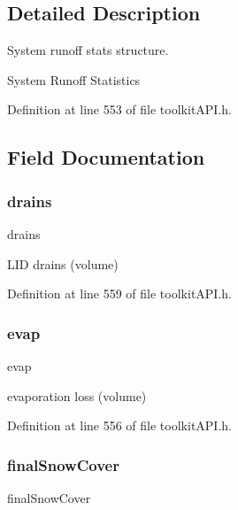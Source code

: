 \subsection{Detailed Description}
System runoff stats structure. 

System Runoff Statistics 

Definition at line 553 of file toolkit\+A\+P\+I.\+h.



\subsection{Field Documentation}
\mbox{\label{struct_s_m___runoff_totals_aee262996ca8263b6f94774a0c337ddb4}} 
\subsubsection{\texorpdfstring{drains}{drains}}
{\footnotesize\ttfamily drains}

L\+ID drains (volume) 

Definition at line 559 of file toolkit\+A\+P\+I.\+h.

\mbox{\label{struct_s_m___runoff_totals_aac3c1df7592191453d2ff02e5ff1b7e6}} 
\subsubsection{\texorpdfstring{evap}{evap}}
{\footnotesize\ttfamily evap}

evaporation loss (volume) 

Definition at line 556 of file toolkit\+A\+P\+I.\+h.

\mbox{\label{struct_s_m___runoff_totals_a50e84cf1314dcc39864c68c3ad316055}} 
\subsubsection{\texorpdfstring{finalSnowCover}{finalSnowCover}}
{\footnotesize\ttfamily final\+Snow\+Cover}

